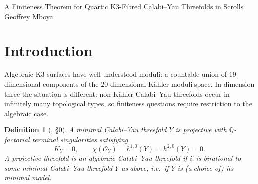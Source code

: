 \documentclass[11pt]{article}
\newtheorem{definition}[theorem]{Definition}
\newcommand{\PP}{\mathbb{P}}
\newcommand{\ZZ}{\mathbb{Z}}
\newcommand{\QQ}{\mathbb{Q}}
\begin{document}
	
	\begin{center}
		{\huge A Finiteness Theorem for Quartic K3-Fibred Calabi--Yau Threefolds in Scrolls} \\[0.8cm]
		\Large Geoffrey Mboya \\[0.3cm]
	\end{center}
	
	\begin{abstract}
		\noindent We study a restricted form of Gross's finiteness problem for algebraic minimal Calabi--Yau threefolds: those fibred by quartic K3 surfaces and realised as anticanonical hypersurfaces in stacky scrolls $\PP^1\times[\PP^3/\ZZ_n]$. Beyond the ten straight-scroll families of \cite[Table~1]{MboyaSzendroi2023}, we introduce orbifold scrolls $(\PP^1\times\PP^3)/\ZZ_n$ and apply the Reid--Shepherd-Barron--Tai criterion to determine which admit canonical anticanonical hypersurfaces. Only finitely many weight vectors arise for each $n$; we classify $n=1,2,3$ completely and compute all Hodge numbers, giving fourteen deformation families in total. Engel, Filipazzi, Greer, Mauri and Svaldi \cite{EngelFilipazziGreerMauriSvaldi2025} have since established boundedness for fibred Calabi--Yau threefolds in general, settling the existence question this restricted case exemplifies; what remains, and what we supply here, is the explicit classification: weight vectors, singularity types, and Hodge data.
		
		\medskip
	\end{abstract}
	
	
	\section{Introduction}
	
	Algebraic K3 surfaces have well-understood moduli: a countable union of $19$-dimensional components of the $20$-dimensional K\"ahler moduli space. In dimension three the situation is different: non-K\"ahler Calabi--Yau threefolds occur in infinitely many topological types, so finiteness questions require restriction to the algebraic case.
	
	\begin{definition}[\cite{Gross1994}, \S0]
		A \emph{minimal Calabi--Yau threefold} $Y$ is projective with $\QQ$-factorial terminal singularities satisfying
		\[
		K_Y = 0,\qquad \chi(\mathcal{O}_Y)=h^{1,0}(Y)=h^{2,0}(Y)=0.
		\]
		A projective threefold is an \emph{algebraic Calabi--Yau threefold} if it is birational to some minimal Calabi--Yau threefold $Y$ as above, i.e.\ if $Y$ is (a choice of) its minimal model.
	\end{definition}
	
\end{document}
